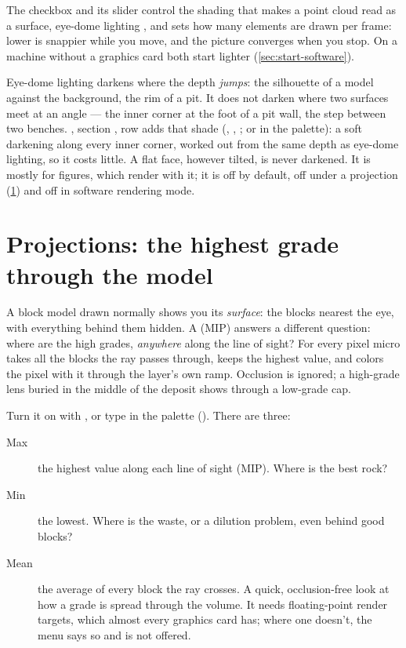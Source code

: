 The  checkbox and its  slider control the shading that makes a point cloud read as a surface, eye-dome lighting \parencite{boucheny2009}, and  sets how many elements are drawn per frame: lower is snappier while you move, and the picture converges when you stop. On a machine without a graphics card both start lighter (\cref{sec:start-software}).

Eye-dome lighting darkens where the depth \emph{jumps}: the silhouette of a model against the background, the rim of a pit. It does not darken where two surfaces meet at an angle — the inner corner at the foot of a pit wall, the step between two benches. , section , row  adds that shade (, , ; or  in the palette): a soft darkening along every inner corner, worked out from the same depth as eye-dome lighting, so it costs little. A flat face, however tilted, is never darkened. It is mostly for figures, which render with it; it is off by default, off under a projection (\cref{sec:color-projection}) and off in software rendering mode.

\section{Projections: the highest grade through the model}\label{sec:color-projection}
A block model drawn normally shows you its \emph{surface}: the blocks nearest the eye, with everything behind them hidden. A  (MIP) answers a different question: where are the high grades, \emph{anywhere} along the line of sight? For every pixel micro takes all the blocks the ray passes through, keeps the highest value, and colors the pixel with it through the layer's own ramp. Occlusion is ignored; a high-grade lens buried in the middle of the deposit shows through a low-grade cap.

Turn it on with , or type  in the palette (). There are three:

\begin{description}
\item[Max] the highest value along each line of sight (MIP). Where is the best rock?
\item[Min] the lowest. Where is the waste, or a dilution problem, even behind good blocks?
\item[Mean] the average of every block the ray crosses. A quick, occlusion-free look at how a grade is spread through the volume. It needs floating-point render targets, which almost every graphics card has; where one doesn't, the menu says so and  is not offered.
\end{description}

